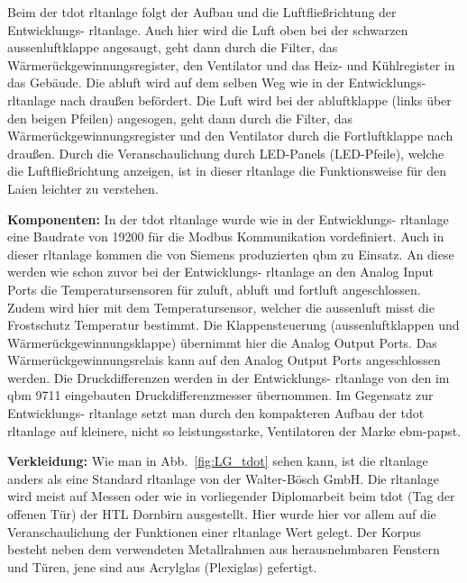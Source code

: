 Beim der \gls{tdot} \ac{rltanlage} folgt der Aufbau und die Luftfließrichtung der Entwicklungs- \ac{rltanlage}. Auch hier wird die Luft oben bei der schwarzen \gls{aussenluft}klappe angesaugt, geht dann durch die Filter, das Wärmerückgewinnungsregister, den Ventilator und das Heiz- und Kühlregister in das Gebäude. Die \gls{abluft} wird auf dem selben Weg wie in der Entwicklungs- \ac{rltanlage} nach draußen befördert. Die Luft wird bei der \gls{abluft}klappe (links über den beigen Pfeilen) angesogen, geht dann durch die Filter, das Wärmerückgewinnungsregister und den Ventilator durch die Fortluftklappe nach draußen. Durch die Veranschaulichung durch LED-Panels (LED-Pfeile), welche die Luftfließrichtung anzeigen, ist in dieser \ac{rltanlage} die Funktionsweise für den Laien leichter zu verstehen.

\textbf{Komponenten:}
In der \gls{tdot} \ac{rltanlage} wurde wie in der Entwicklungs- \ac{rltanlage} eine Baudrate von 19200 für die Modbus Kommunikation vordefiniert. Auch in dieser \ac{rltanlage} kommen die von Siemens produzierten \gls{qbm} zu Einsatz. An diese werden wie schon zuvor bei der Entwicklungs- \ac{rltanlage} an den Analog Input Ports die Temperatursensoren für \gls{zuluft}, \gls{abluft} und \gls{fortluft} angeschlossen. Zudem wird hier mit dem Temperatursensor, welcher die \gls{aussenluft} misst die Frostschutz Temperatur bestimmt. Die Klappensteuerung (\gls{aussenluft}klappen und Wärmerückgewinnungsklappe) übernimmt hier die Analog Output Ports. Das  Wärmerückgewinnungsrelais kann auf den Analog Output Ports angeschlossen werden. Die Druckdifferenzen werden in der Entwicklungs- \ac{rltanlage} von den im \gls{qbm} 9711 eingebauten Druckdifferenzmesser übernommen. Im Gegensatz zur Entwicklungs- \ac{rltanlage} setzt man durch den kompakteren Aufbau der \gls{tdot} \ac{rltanlage} auf kleinere, nicht so leistungsstarke, Ventilatoren der Marke ebm-papst. 


\textbf{Verkleidung:}
Wie man in Abb.~\ref{fig:LG_tdot} sehen kann, ist die \ac{rltanlage} anders als eine Standard \ac{rltanlage} von der Walter-Bösch GmbH. Die \ac{rltanlage} wird meist auf Messen oder wie in vorliegender Diplomarbeit beim \gls{tdot} (Tag der offenen Tür) der HTL Dornbirn ausgestellt. Hier wurde hier vor allem auf die Veranschaulichung der Funktionen einer \ac{rltanlage} Wert gelegt. Der Korpus besteht neben dem verwendeten Metallrahmen aus herausnehmbaren Fenstern und Türen, jene sind aus Acrylglas (Plexiglas) gefertigt. 

\newpage
